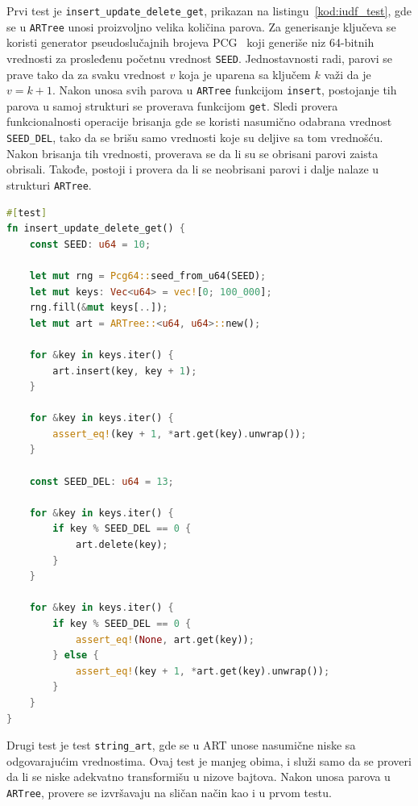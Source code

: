 \documentclass[12pt,oneside]{memoir}
\begin{document}
Prvi test je \texttt{insert\_update\_delete\_get}, prikazan na
listingu~\ref{kod:iudf_test}, gde se
u \texttt{ARTree} unosi proizvoljno velika količina parova.
Za generisanje ključeva se koristi generator
pseudoslučajnih brojeva PCG~\cite{pcg} koji generiše niz
64-bitnih vrednosti za prosleđenu početnu vrednost \texttt{SEED}.
Jednostavnosti radi, parovi se prave tako da
za svaku vrednost $v$ koja je uparena sa ključem $k$
važi da je $v = k + 1$. Nakon unosa svih parova u \texttt{ARTree} funkcijom
\texttt{insert}, postojanje tih parova u samoj strukturi
se proverava funkcijom \texttt{get}. Sledi provera funkcionalnosti
operacije brisanja gde se koristi nasumično odabrana vrednost
\texttt{SEED\_DEL}, tako da se brišu samo vrednosti koje su deljive
sa tom vrednošću. Nakon brisanja tih vrednosti, proverava se
da li su se obrisani parovi zaista obrisali. Takođe, postoji i
provera da li se neobrisani parovi i dalje nalaze u strukturi \texttt{ARTree}.\

\begin{lstlisting}[language=Rust,
                   caption={Test \texttt{insert\_update\_delete\_get}},
                   label={kod:iudf_test}]
#[test]
fn insert_update_delete_get() {
    const SEED: u64 = 10;

    let mut rng = Pcg64::seed_from_u64(SEED);
    let mut keys: Vec<u64> = vec![0; 100_000];
    rng.fill(&mut keys[..]);
    let mut art = ARTree::<u64, u64>::new();

    for &key in keys.iter() {
        art.insert(key, key + 1);
    }

    for &key in keys.iter() {
        assert_eq!(key + 1, *art.get(key).unwrap());
    }

    const SEED_DEL: u64 = 13;

    for &key in keys.iter() {
        if key % SEED_DEL == 0 {
            art.delete(key);
        }
    }

    for &key in keys.iter() {
        if key % SEED_DEL == 0 {
            assert_eq!(None, art.get(key));
        } else {
            assert_eq!(key + 1, *art.get(key).unwrap());
        }
    }
}
\end{lstlisting}

Drugi test je test \texttt{string\_art},
gde se u ART unose nasumične niske sa odgovarajućim vrednostima.
Ovaj test je manjeg obima, i služi samo da se proveri da li se niske
adekvatno transformišu u nizove bajtova. Nakon unosa parova u \texttt{ARTree},
provere se izvršavaju na sličan način kao i u prvom testu.
\end{document}
